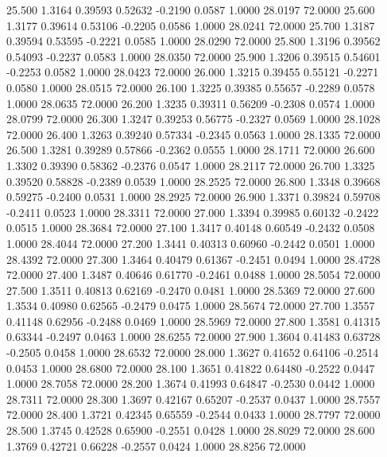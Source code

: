   25.500   1.3164   0.39593   0.52632  -0.2190   0.0587   1.0000  28.0197  72.0000
  25.600   1.3177   0.39614   0.53106  -0.2205   0.0586   1.0000  28.0241  72.0000
  25.700   1.3187   0.39594   0.53595  -0.2221   0.0585   1.0000  28.0290  72.0000
  25.800   1.3196   0.39562   0.54093  -0.2237   0.0583   1.0000  28.0350  72.0000
  25.900   1.3206   0.39515   0.54601  -0.2253   0.0582   1.0000  28.0423  72.0000
  26.000   1.3215   0.39455   0.55121  -0.2271   0.0580   1.0000  28.0515  72.0000
  26.100   1.3225   0.39385   0.55657  -0.2289   0.0578   1.0000  28.0635  72.0000
  26.200   1.3235   0.39311   0.56209  -0.2308   0.0574   1.0000  28.0799  72.0000
  26.300   1.3247   0.39253   0.56775  -0.2327   0.0569   1.0000  28.1028  72.0000
  26.400   1.3263   0.39240   0.57334  -0.2345   0.0563   1.0000  28.1335  72.0000
  26.500   1.3281   0.39289   0.57866  -0.2362   0.0555   1.0000  28.1711  72.0000
  26.600   1.3302   0.39390   0.58362  -0.2376   0.0547   1.0000  28.2117  72.0000
  26.700   1.3325   0.39520   0.58828  -0.2389   0.0539   1.0000  28.2525  72.0000
  26.800   1.3348   0.39668   0.59275  -0.2400   0.0531   1.0000  28.2925  72.0000
  26.900   1.3371   0.39824   0.59708  -0.2411   0.0523   1.0000  28.3311  72.0000
  27.000   1.3394   0.39985   0.60132  -0.2422   0.0515   1.0000  28.3684  72.0000
  27.100   1.3417   0.40148   0.60549  -0.2432   0.0508   1.0000  28.4044  72.0000
  27.200   1.3441   0.40313   0.60960  -0.2442   0.0501   1.0000  28.4392  72.0000
  27.300   1.3464   0.40479   0.61367  -0.2451   0.0494   1.0000  28.4728  72.0000
  27.400   1.3487   0.40646   0.61770  -0.2461   0.0488   1.0000  28.5054  72.0000
  27.500   1.3511   0.40813   0.62169  -0.2470   0.0481   1.0000  28.5369  72.0000
  27.600   1.3534   0.40980   0.62565  -0.2479   0.0475   1.0000  28.5674  72.0000
  27.700   1.3557   0.41148   0.62956  -0.2488   0.0469   1.0000  28.5969  72.0000
  27.800   1.3581   0.41315   0.63344  -0.2497   0.0463   1.0000  28.6255  72.0000
  27.900   1.3604   0.41483   0.63728  -0.2505   0.0458   1.0000  28.6532  72.0000
  28.000   1.3627   0.41652   0.64106  -0.2514   0.0453   1.0000  28.6800  72.0000
  28.100   1.3651   0.41822   0.64480  -0.2522   0.0447   1.0000  28.7058  72.0000
  28.200   1.3674   0.41993   0.64847  -0.2530   0.0442   1.0000  28.7311  72.0000
  28.300   1.3697   0.42167   0.65207  -0.2537   0.0437   1.0000  28.7557  72.0000
  28.400   1.3721   0.42345   0.65559  -0.2544   0.0433   1.0000  28.7797  72.0000
  28.500   1.3745   0.42528   0.65900  -0.2551   0.0428   1.0000  28.8029  72.0000
  28.600   1.3769   0.42721   0.66228  -0.2557   0.0424   1.0000  28.8256  72.0000
